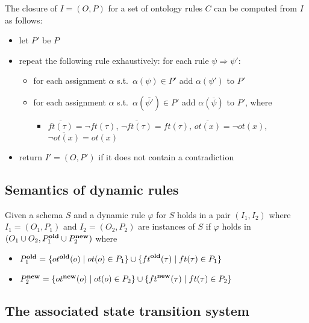 \documentclass[11pt]{amsart}
\newcommand{\old}[1]{{#1}^{\textrm{\textbf{old}}}}
\newcommand{\new}[1]{{#1}^{\textrm{\textbf{new}}}}
\begin{document}
The closure of $I = (O, P)$ for a set of ontology rules $C$ can be computed from $I$ as follows:
\begin{itemize}
  \item let $P'$ be $P$
  \item repeat the following rule exhaustively: for each rule $\psi \Rightarrow \psi'$:
        \begin{itemize}
          \item for each assignment $\alpha$ s.t.\ $\alpha(\psi) \in P'$ add $\alpha(\psi')$ to $P'$
          \item for each assignment $\alpha$ s.t.\ $\alpha(\overline{\psi'}) \in P'$ add $\alpha(\overline{\psi})$ to $P'$, where
           \begin{itemize}
             \item $\overline{ft(\tau)} = \neg{ft(\tau)}$, $\overline{\neg{ft(\tau)}} = ft(\tau)$, $\overline{ot(x)} = \neg{ot(x)}$, $\overline{\neg{ot(x)}} = ot(x)$
           \end{itemize}
        \end{itemize}
  \item return $I' = (O, P')$ if it does not contain a contradiction
\end{itemize}

\subsection{Semantics of dynamic rules} Given a schema $S$ and a dynamic rule $\varphi$ for $S$ holds in a pair $(I_1, I_2)$ where $I_1 = (O_1, P_1)$ and $I_2 = (O_2, P_2)$ are instances of $S$ if $\varphi$ holds in $(O_1 \cup O_2, \old{P}_1 \cup \new{P}_2)$ where
\begin{itemize}
  \item $\old{P}_1 = \{ \old{ot}(o) \mid ot(o) \in P_1 \} \cup \{ \old{ft}(\tau) \mid ft(\tau) \in P_1 \}$
  \item $\new{P}_2 = \{ \new{ot}(o) \mid ot(o) \in P_2 \} \cup \{ \new{ft}(\tau) \mid ft(\tau) \in P_2 \}$
\end{itemize}

\subsection{The associated state transition system}
\end{document}
